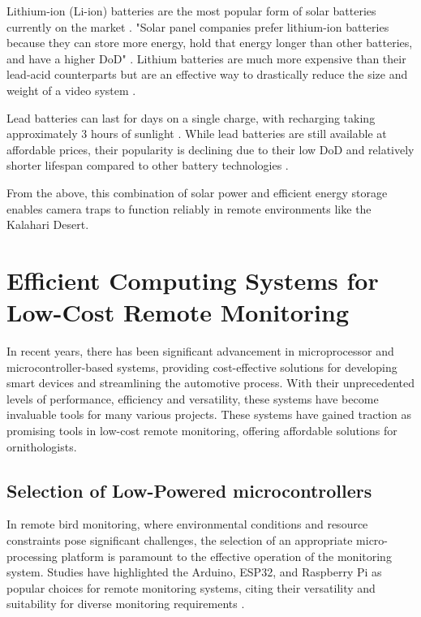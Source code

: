 \documentclass[class=report,11pt,crop=false]{standalone}
\begin{document}
Lithium-ion (Li-ion) batteries are the most popular form of solar batteries currently on the market \cite{Palmetto}. "Solar panel companies prefer lithium-ion batteries because they can store more energy, hold that energy longer than other batteries, and have a higher \acrfull{DoD}" \cite{Palmetto}. Lithium batteries are much more expensive than their lead-acid counterparts but are an effective way to drastically reduce the size and weight of a video system \cite{CAMDevelopmentOfNestMonitoring}.

Lead batteries can last for days on a single charge, with recharging taking approximately 3 hours of sunlight \cite{PowerNestingRaptors}. While lead batteries are still available at affordable prices, their popularity is declining due to their low \acrshort{DoD} and relatively shorter lifespan compared to other battery technologies \cite{Palmetto}. 

From the above, this combination of solar power and efficient energy storage enables camera traps to function reliably in remote environments like the Kalahari Desert.

\newpage
\section{Efficient Computing Systems for Low-Cost Remote Monitoring
}
In recent years, there has been significant advancement in microprocessor and microcontroller-based systems, providing cost-effective solutions for developing smart devices and streamlining the automotive process. With their unprecedented levels of performance, efficiency and versatility, these systems have become invaluable tools for many various projects. These systems have gained traction as promising tools in low-cost remote monitoring, offering affordable solutions for ornithologists. 

\subsection{Selection of Low-Powered microcontrollers}

In remote bird monitoring, where environmental conditions and resource constraints pose significant challenges, the selection of an appropriate micro-processing platform is paramount to the effective operation of the monitoring system. Studies have highlighted the Arduino, ESP32, and Raspberry Pi as popular choices for remote monitoring systems, citing their versatility and suitability for diverse monitoring requirements \cite{ArduinoCCTV} \cite{ESP32Design} \cite{RaspSys}. %
\end{document}
